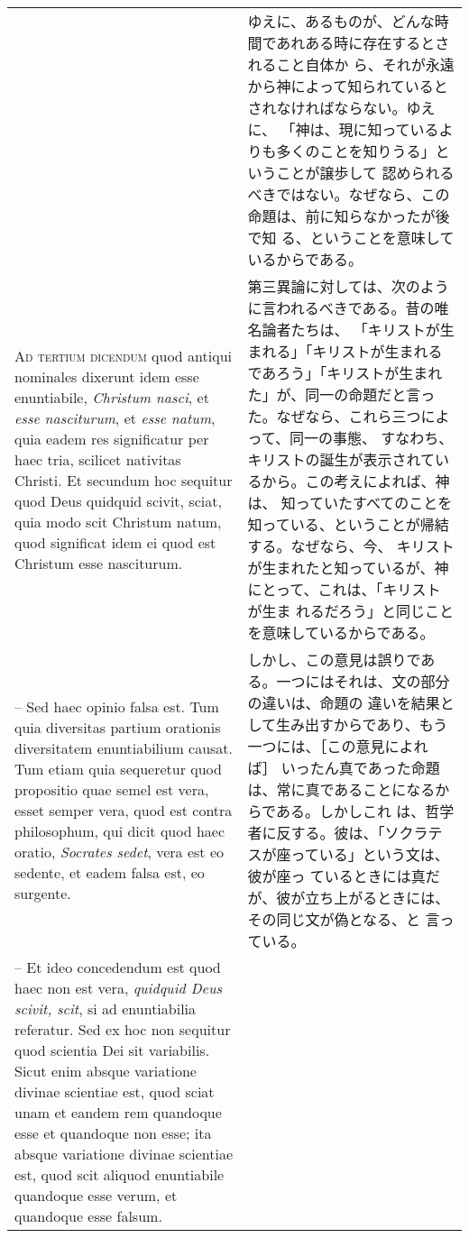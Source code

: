 \documentclass[10pt]{jsarticle} %
\begin{document}
\begin{longtable}{p{21em}p{21em}}
&

ゆえに、あるものが、どんな時間であれある時に存在するとされること自体か
ら、それが永遠から神によって知られているとされなければならない。ゆえに、
「神は、現に知っているよりも多くのことを知りうる」ということが譲歩して
認められるべきではない。なぜなら、この命題は、前に知らなかったが後で知
る、ということを意味しているからである。

\\


{\scshape Ad tertium dicendum} quod antiqui nominales dixerunt idem
esse enuntiabile, {\itshape Christum nasci}, et {\itshape esse
nasciturum}, et {\itshape esse natum}, quia eadem res significatur per
haec tria, scilicet nativitas Christi. Et secundum hoc sequitur quod
Deus quidquid scivit, sciat, quia modo scit Christum natum, quod
significat idem ei quod est Christum esse nasciturum.


&

第三異論に対しては、次のように言われるべきである。昔の唯名論者たちは、
「キリストが生まれる」「キリストが生まれるであろう」「キリストが生まれ
た」が、同一の命題だと言った。なぜなら、これら三つによって、同一の事態、
すなわち、キリストの誕生が表示されているから。この考えによれば、神は、
知っていたすべてのことを知っている、ということが帰結する。なぜなら、今、
キリストが生まれたと知っているが、神にとって、これは、「キリストが生ま
れるだろう」と同じことを意味しているからである。

\\


-- Sed haec opinio falsa est. Tum quia diversitas partium orationis
diversitatem enuntiabilium causat. Tum etiam quia sequeretur quod
propositio quae semel est vera, esset semper vera, quod est contra
philosophum, qui dicit quod haec oratio, {\itshape Socrates sedet},
vera est eo sedente, et eadem falsa est, eo surgente.


&

しかし、この意見は誤りである。一つにはそれは、文の部分の違いは、命題の
違いを結果として生み出すからであり、もう一つには、［この意見によれば］
いったん真であった命題は、常に真であることになるからである。しかしこれ
は、哲学者に反する。彼は、「ソクラテスが座っている」という文は、彼が座っ
ているときには真だが、彼が立ち上がるときには、その同じ文が偽となる、と
言っている。

\\


-- Et ideo concedendum est quod haec non est vera, {\itshape quidquid
Deus scivit, scit}, si ad enuntiabilia referatur. Sed ex hoc non
sequitur quod scientia Dei sit variabilis. Sicut enim absque
variatione divinae scientiae est, quod sciat unam et eandem rem
quandoque esse et quandoque non esse; ita absque variatione divinae
scientiae est, quod scit aliquod enuntiabile quandoque esse verum, et
quandoque esse falsum.



\end{longtable}
\end{document}
